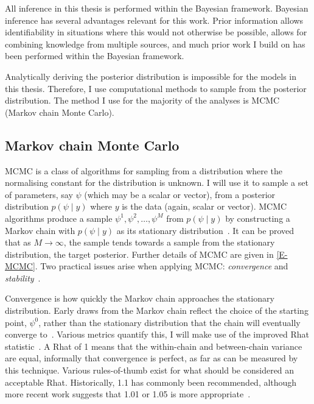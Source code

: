 \documentclass[thesis.tex]{subfiles}
\begin{document}
All inference in this thesis is performed within the Bayesian framework.
Bayesian inference has several advantages relevant for this work.
Prior information allows identifiability in situations where this would not otherwise be possible, allows for combining knowledge from multiple sources, and much prior work I build on has been performed within the Bayesian framework.

Analytically deriving the posterior distribution is impossible for the models in this thesis.
Therefore, I use computational methods to sample from the posterior distribution.
The method I use for the majority of the analyses is MCMC (Markov chain Monte Carlo).

\subsection{Markov chain Monte Carlo} \label{intro:sec:MCMC}

MCMC is a class of algorithms for sampling from a distribution where the normalising constant for the distribution is unknown.
I will use it to sample a set of parameters, say $\psi$ (which may be a scalar or vector), from a posterior distribution $p(\psi \mid y)$ where $y$ is the data (again, scalar or vector).
MCMC algorithms produce a sample $\psi^1, \psi^2, \dots, \psi^M$ from $p(\psi \mid y)$ by constructing a Markov chain with $p(\psi \mid y)$ as its stationary distribution~\autocite[275]{gelmanBDA}.
It can be proved that as $M\to\infty$, the sample tends towards a sample from the stationary distribution, \ie the target posterior.
Further details of MCMC are given in \cref{E-MCMC}.
Two practical issues arise when applying MCMC: \emph{convergence} and \emph{stability}~\autocite[72]{lunnBUGS}.

Convergence is how quickly the Markov chain approaches the stationary distribution.
Early draws from the Markov chain reflect the choice of the starting point, $\psi^0$, rather than the stationary distribution that the chain will eventually converge to~\autocite[282]{gelmanBDA}.
Various metrics quantify this, I will make use of the improved Rhat statistic~\autocite{vehtariRhat}.
A Rhat of 1 means that the within-chain and between-chain variance are equal, informally that convergence is perfect, as far as can be measured by this technique.
Various rules-of-thumb exist for what should be considered an acceptable Rhat.
Historically, 1.1 has commonly been recommended, although more recent work suggests that 1.01 or 1.05 is more appropriate~\autocite{vehtariRhat}.
\end{document}
